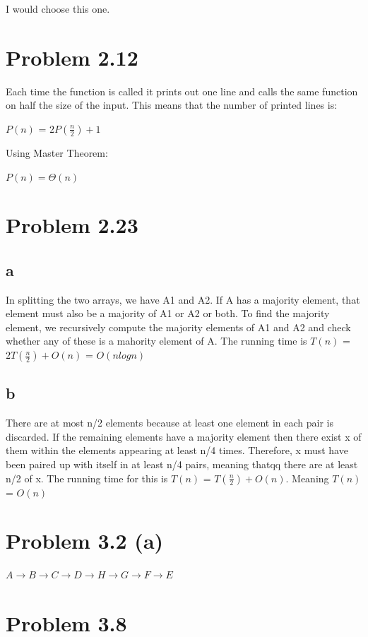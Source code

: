 \documentclass{article}
\begin{document}
I would choose this one.

\section{Problem 2.12}
Each time the function is called it prints out one line and calls the same function on half the size of the input. This means that the number of printed lines is:

$P(n)$ = $2P(\frac{n}{2}) + 1$

\vspace{2mm}

Using Master Theorem:

$P(n) = \Theta(n)$

\section{Problem 2.23}
\subsection{a}
In splitting the two arrays, we have A1 and A2. If A has a majority element, that element must also be a majority of A1 or A2 or both. To find the majority element, we recursively compute the majority elements of A1 and A2 and check whether any of these is a mahority element of A. The running time is $T(n)$ = $2T(\frac{n}{2}) + O(n)$ = $O(nlogn)$

\subsection{b}
There are at most n/2 elements because at least one element in each pair is discarded. If the remaining elements have a majority element then there exist x of them within the elements appearing at least n/4 times. Therefore, x must have been paired up with itself in at least n/4 pairs, meaning thatqq there are at least n/2 of x. The running time for this is $T(n)$ = $T(\frac{n}{2}) + O(n)$. Meaning $T(n)$ = $O(n)$ 

\section{Problem 3.2 (a)}
$A \rightarrow B \rightarrow C \rightarrow D \rightarrow H \rightarrow G \rightarrow F \rightarrow E$

\section{Problem 3.8}
\end{document}

